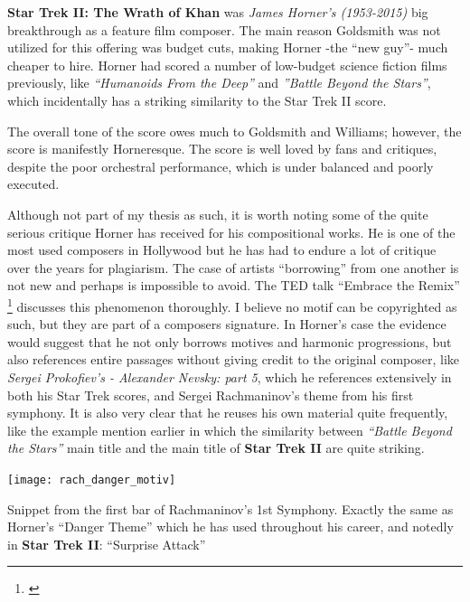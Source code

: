 \textbf{Star Trek II: The Wrath of Khan} was \textit{James Horner's (1953-2015)} big breakthrough as a feature film composer. The main reason Goldsmith was not utilized for this offering was budget cuts, making Horner -the ``new guy''- much cheaper to hire. Horner had scored a number of low-budget science fiction films previously, like \textit{``Humanoids From the Deep''} and \textit{''Battle Beyond the Stars''}, which incidentally has a striking similarity to the Star Trek II score.

The overall tone of the score owes much to Goldsmith and Williams; however, the score is manifestly Horneresque. The score is well loved by fans and critiques, despite the poor orchestral performance, which is under balanced and poorly executed.

Although not part of my thesis as such, it is worth noting some of the quite serious critique Horner has received for his compositional works. He is one of the most used composers in Hollywood but he has had to endure a lot of critique over the years for plagiarism. The case of artists ``borrowing'' from one another is not new and perhaps is impossible to avoid. The TED talk ``Embrace the Remix'' \footnote{\textcite{Ferguson2012}} discusses this phenomenon thoroughly. I believe no motif can be copyrighted as such, but they are part of a composers signature. In Horner's case the evidence would suggest that he not only borrows motives and harmonic progressions, but also references entire passages without giving credit to the original composer, like \textit{Sergei Prokofiev's - Alexander Nevsky: part 5}, which he references extensively in both his Star Trek scores, and Sergei Rachmaninov's theme from his first symphony. It is also very clear that he reuses his own material quite frequently, like the example mention earlier in which the similarity between \textit{``Battle Beyond the Stars''} main title and the main title of \textbf{Star Trek II} are quite striking.

\begin{marginfigure}
\center
\texttt{[image: rach\_danger\_motiv]}
	\caption[Rachmaninov's 1st Symphony]{Snippet from the first bar of Rachmaninov's 1st Symphony. Exactly the same as Horner's ``Danger Theme'' which he has used throughout his career, and notedly in \textbf{Star Trek II}: ``Surprise Attack''}
	\label{fg:danger theme}
\end{marginfigure}

